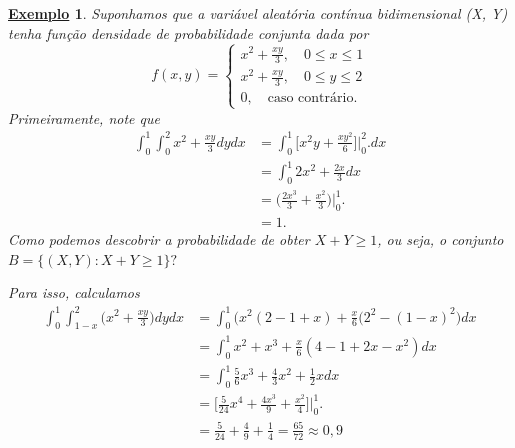 \documentclass{article}
\newtheorem{example}{\underline{Exemplo}}
\begin{document}
\begin{example}
  Suponhamos que a variável aleatória contínua bidimensional (X, Y) tenha função densidade de probabilidade conjunta dada por 
  \[
    f(x, y) = \left\{\begin{array}{ll}
        x^{2} + \frac{xy}{3},\quad 0 \leq x\leq 1\\
        x^{2} + \frac{xy}{3},\quad 0\leq y\leq 2\\
        0,\quad \text{caso contrário.}
    \end{array}\right.
  \]
  Primeiramente, note que 
  \begin{align*}
    \int_{0}^{1}\int_{0}^{2}x^{2}+\frac{xy}{3}dydx &= \int_{0}^{1}\biggl[x^{2}y + \frac{xy^{2}}{6}\biggr]\biggl|_{0}^{2}\biggr.dx\\
                                                   &= \int_{0}^{1}2x^{2}+\frac{2x}{3}dx \\
                                                   &= \biggl(\frac{2x^{3}}{3}+\frac{x^{2}}{3}\biggr)\biggl|_{0}^{1}\biggr.\\
                                                   &= 1.
  \end{align*}
  Como podemos descobrir a probabilidade de obter \(X + Y \geq 1\), ou seja, o conjunto \(B = \{(X, Y): X + Y \geq 1\}?\)

  Para isso, calculamos
  \begin{align*}
    \int_{0}^{1}\int_{1 - x}^{2}\biggl(x^{2} + \frac{xy}{3}\biggr)dydx &= \int_{0}^{1}\biggl(x^{2}(2-1+x) + \frac{x}{6}(2^{2}-(1-x)^{2}\biggr)dx\\
                                                                       &= \int_{0}^{1}x^{2} + x^{3} + \frac{x}{6}(4-1+2x-x^{2})dx\\
                                                                       &= \int_{0}^{1}\frac{5}{6}x^{3} + \frac{4}{3}x^{2} + \frac{1}{2}xdx\\
                                                                       &= \biggl[\frac{5}{24}x^{4} + \frac{4x^{3}}{9} + \frac{x^{2}}{4}\biggr]\biggl|_{0}^{1}\biggr.\\
                                                                       &= \frac{5}{24} + \frac{4}{9} + \frac{1}{4} = \frac{65}{72}\approx 0,9
  \end{align*}
\end{example}
\end{document}
